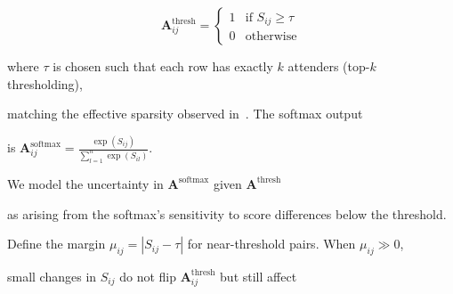 $$






\mathbf{A}^{\text{thresh}}_{ij} = 






\begin{cases}






1 & \text{if } S_{ij} \geq \tau \\






0 & \text{otherwise}






\end{cases}






$$






where $\tau$ is chosen such that each row has exactly $k$ attenders (top-$k$ thresholding),






matching the effective sparsity observed in~\cite{mimo2026empirical}. The softmax output






is $\mathbf{A}^{\text{softmax}}_{ij} = \frac{\exp(S_{ij})}{\sum_{l=1}^n \exp(S_{il})}$.













We model the uncertainty in $\mathbf{A}^{\text{softmax}}$ given $\mathbf{A}^{\text{thresh}}$






as arising from the softmax's sensitivity to score differences below the threshold.






Define the margin $\mu_{ij} = |S_{ij} - \tau|$ for near-threshold pairs. When $\mu_{ij} \gg 0$,






small changes in $S_{ij}$ do not flip $\mathbf{A}^{\text{thresh}}_{ij}$ but still affect






